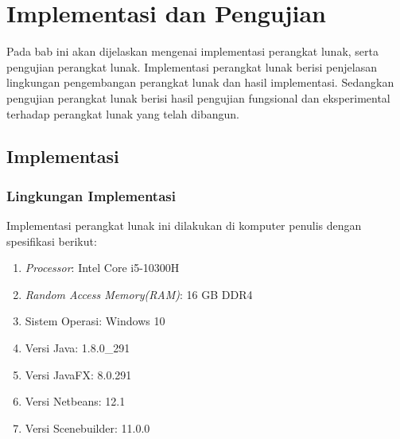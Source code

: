 \chapter{Implementasi dan Pengujian}
\label{chap:implementasi&pengujian}

Pada bab ini akan dijelaskan mengenai implementasi perangkat lunak, serta pengujian perangkat lunak. Implementasi perangkat lunak berisi penjelasan lingkungan pengembangan perangkat lunak dan hasil implementasi. Sedangkan pengujian perangkat lunak berisi hasil pengujian fungsional dan eksperimental terhadap perangkat lunak yang telah dibangun.

\section{Implementasi}

\subsection{Lingkungan Implementasi}
\label{lingkungan_implementasi}
Implementasi perangkat lunak ini dilakukan di komputer penulis dengan spesifikasi berikut:
\begin{enumerate}
    \item \textit{Processor}: Intel Core i5-10300H
    \item \textit{Random Access Memory(RAM)}: 16 GB DDR4
    \item Sistem Operasi: Windows 10
    \item Versi Java: 1.8.0\_291
    \item Versi JavaFX: 8.0.291
    \item Versi Netbeans: 12.1
    \item Versi Scenebuilder: 11.0.0
\end{enumerate}

